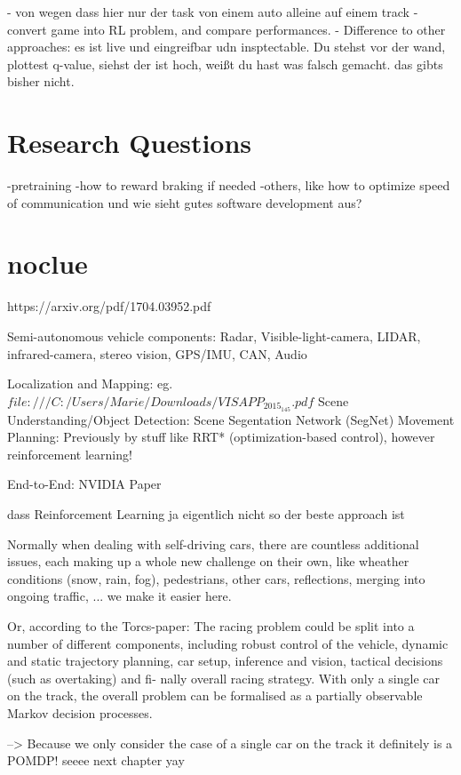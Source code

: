 - von wegen dass hier nur der task von einem auto alleine auf einem track
- convert game into RL problem, and compare performances.
- Difference to other approaches: es ist live und eingreifbar udn insptectable. Du stehst vor der wand, plottest q-value, siehst der ist hoch, weißt du hast was falsch gemacht. das gibts bisher nicht.


\section{Research Questions}

-pretraining
-how to reward braking if needed
-others, like how to optimize speed of communication und wie sieht gutes software development aus?

\section{noclue}


https://arxiv.org/pdf/1704.03952.pdf

Semi-autonomous vehicle components: Radar, Visible-light-camera, LIDAR, infrared-camera, stereo vision, GPS/IMU, CAN, Audio

Localization and Mapping: eg. $file:///C:/Users/Marie/Downloads/VISAPP_2015_145.pdf$
Scene Understanding/Object Detection: Scene Segentation Network (SegNet)
Movement Planning: Previously by stuff like RRT* (optimization-based control), however reinforcement learning!

End-to-End: NVIDIA Paper

dass Reinforcement Learning ja eigentlich nicht so der beste approach ist


Normally when dealing with self-driving cars, there are countless additional issues, each making up a whole new challenge on their own, like wheather conditions (snow, rain, fog), pedestrians, other cars, reflections, merging into ongoing traffic, ...
we make it easier here.

Or, according to the Torcs-paper:
The racing problem could be split into a number of different components, including
robust control of the vehicle, dynamic and static trajectory planning,
car setup, inference and vision, tactical decisions (such as overtaking) and fi-
nally overall racing strategy. With only a single car on the track, the overall
problem can be formalised as a partially observable Markov decision processes.



--> Because we only consider the case of a  single car on the track it definitely is a POMDP! seeee next chapter yay
